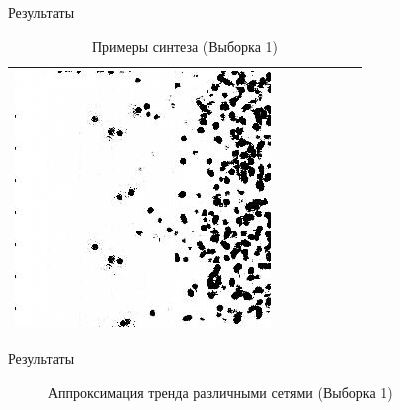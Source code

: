 \documentclass[12pt]{beamer}
\begin{document}
\begin{frame}{Результаты}
\begin{table}
\begin{center}
\begin{tabular}{p{1.2cm} p{1.2cm} p{1.2cm} p{1.2cm} p{1.2cm} p{1.2cm} p{1.2cm}}
					\includegraphics[width=1\linewidth]{8-results/sand-trend2/nf32/gen3}
					\\
					\hline
				\end{tabular}
				\caption{Примеры синтеза (Выборка 1)}
			\end{center}
		\end{table}
	\end{frame}
	
	\begin{frame}{Результаты}
		\begin{figure}
			\caption{Аппроксимация тренда различными сетями (Выборка 1)}
		\end{figure}
	\end{frame}
	
\end{document}
